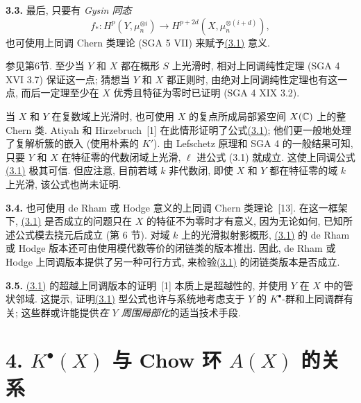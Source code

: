 \textbf{3.3.} 最后, 只要有 \emph{Gysin 同态}
\[
  f_*:H^p(Y,\mu_n^{\otimes i})
  \longrightarrow H^{p+2d}(X,\mu_n^{\otimes(i+d)}),
\]
也可使用上同调 Chern 类理论 (SGA 5 VII) 来赋予\hyperlink{sga6.e14.eq.3-1}{(3.1)} 意义.

参见第6节. 至少当 $Y$ 和 $X$ 都在概形 $S$ 上光滑时, 相对上同调纯性定理 (SGA 4 XVI 3.7) 保证这一点; 猜想当 $Y$ 和 $X$ 都正则时, 由绝对上同调纯性定理也有这一点, 而后一定理至少在 $X$ 优秀且特征为零时已证明 (SGA 4 XIX 3.2).

当 $X$ 和 $Y$ 在复数域上光滑时, 也可使用 $X$ 的复点所成局部紧空间 $X(\mathbb C)$ 上的整 Chern 类. Atiyah 和 Hirzebruch~[1] 在此情形证明了公式\hyperlink{sga6.e14.eq.3-1}{(3.1)}; 他们更一般地处理了复解析簇的嵌入 (使用朴素的 $K'$). 由 Lefschetz 原理和 SGA 4 的一般结果可知, 只要 $Y$ 和 $X$ 在特征零的代数闭域上光滑, $\ell$ 进公式 (3.1) 就成立. 这使上同调公式\hyperlink{sga6.e14.eq.3-1}{(3.1)} 极其可信. 但应注意, 目前若域 $k$ 非代数闭, 即使 $X$ 和 $Y$ 都在特征零的域 $k$ 上光滑, 该公式也尚未证明.

\noindent{}\textbf{3.4.}
也可使用 de Rham 或 Hodge 意义的上同调 Chern 类理论~[13]. 在这一框架下, \hyperlink{sga6.e14.eq.3-1}{(3.1)} 是否成立的问题只在 $X$ 的特征不为零时才有意义, 因为无论如何, 已知所述公式模去挠元后成立 (第 6 节). 对域 $k$ 上的光滑拟射影概形, \hyperlink{sga6.e14.eq.3-1}{(3.1)} 的 de Rham 或 Hodge 版本还可由使用模代数等价的闭链类的版本推出. 因此, de Rham 或 Hodge 上同调版本提供了另一种可行方式, 来检验\hyperlink{sga6.e14.eq.3-1}{(3.1)} 的闭链类版本是否成立.

\noindent{}\textbf{3.5.}
\hyperlink{sga6.e14.eq.3-1}{(3.1)} 的超越上同调版本的证明~[1] 本质上是超越性的, 并使用 $Y$ 在 $X$ 中的管状邻域. 这提示, 证明\hyperlink{sga6.e14.eq.3-1}{(3.1)} 型公式也许与系统地考虑支于 $Y$ 的 $K^\bullet$-群和上同调群有关; 这些群或许能提供\emph{在 $Y$ 周围局部化}的适当技术手段.

\section*{4. $K^\bullet(X)$ 与 Chow 环 $A(X)$ 的关系}

